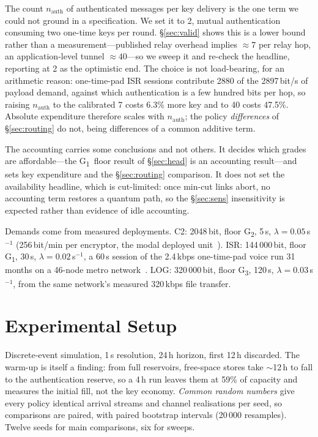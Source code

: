 \documentclass[conference]{IEEEtran}
\newcommand{\GI}{G\textsubscript{1}}
\newcommand{\GII}{G\textsubscript{2}}
\newcommand{\GIII}{G\textsubscript{3}}
\begin{document}
The count $n_{\mathrm{auth}}$ of authenticated messages per key delivery is the one
term we could not ground in a specification. We set it to 2, mutual authentication
consuming two one-time keys per round. \S\ref{sec:valid} shows this is a lower bound
rather than a measurement---published relay overhead implies $\approx7$ per relay
hop, an application-level tunnel $\approx40$---so we sweep it and re-check the
headline, reporting at 2 as the optimistic end. The choice is not load-bearing,
for an arithmetic reason: one-time-pad ISR sessions contribute 2880 of the
2897\,bit/s of payload demand, against which authentication is a few hundred bits
per hop, so raising $n_{\mathrm{auth}}$ to the calibrated 7 costs 6.3\% more key and
to 40 costs 47.5\%. Absolute expenditure therefore scales with $n_{\mathrm{auth}}$;
the policy \emph{differences} of \S\ref{sec:routing} do not, being differences of a
common additive term.

The accounting carries some conclusions and not others. It decides which grades are
affordable---the \GI\ floor result of \S\ref{sec:head} is an accounting result---and
sets key expenditure and the \S\ref{sec:routing} comparison. It does not set the
availability headline, which is cut-limited: once min-cut links abort, no accounting
term restores a quantum path, so the \S\ref{sec:sens} insensitivity is expected
rather than evidence of idle accounting.

Demands come from measured deployments. C2: 2048\,bit, floor \GII, 5\,s,
$\lambda=0.05$\,s$^{-1}$ (256\,bit/min per encryptor, the modal deployed
unit~\cite{stucki}). ISR: 144\,000\,bit, floor \GI, 30\,s,
$\lambda=0.02$\,s$^{-1}$, a 60\,s session of the 2.4\,kbps one-time-pad voice run
31 months on a 46-node metro network~\cite{chen}. LOG: 320\,000\,bit,
floor \GIII, 120\,s, $\lambda=0.03$\,s$^{-1}$, from the same network's measured
320\,kbps file transfer.

\section{Experimental Setup}\label{sec:setup}
Discrete-event simulation, 1\,s resolution, 24\,h horizon, first 12\,h discarded.
The warm-up is itself a finding: from full reservoirs, free-space stores take
$\sim$12\,h to fall to the authentication reserve, so a 4\,h run leaves them at
59\% of capacity and measures the initial fill, not the key economy. \emph{Common
random numbers} give every policy identical arrival streams and channel
realisations per seed, so comparisons are paired, with paired bootstrap intervals
(20\,000 resamples). Twelve seeds for main comparisons, six for sweeps.
\end{document}
